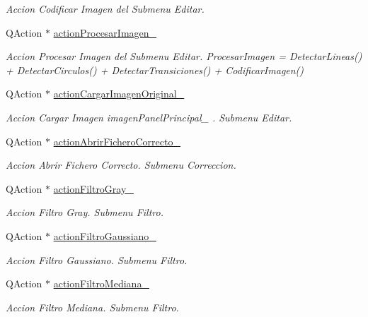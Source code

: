 \begin{DoxyCompactItemize}
\begin{DoxyCompactList}\small\item\em Accion Codificar Imagen del Submenu Editar. \end{DoxyCompactList}\item 
Q\+Action $\ast$ \hyperlink{classCAplicacion_a9fa952c19f9da356432fae60a40cdced}{action\+Procesar\+Imagen\+\_\+}
\begin{DoxyCompactList}\small\item\em Accion Procesar Imagen del Submenu Editar. Procesar\+Imagen = Detectar\+Lineas() + Detectar\+Circulos() + Detectar\+Transiciones() + Codificar\+Imagen() \end{DoxyCompactList}\item 
Q\+Action $\ast$ \hyperlink{classCAplicacion_a3768f71b55ac5e2d77fed775d8ebce74}{action\+Cargar\+Imagen\+Original\+\_\+}
\begin{DoxyCompactList}\small\item\em Accion Cargar Imagen imagen\+Panel\+Principal\+\_\+ . Submenu Editar. \end{DoxyCompactList}\item 
Q\+Action $\ast$ \hyperlink{classCAplicacion_abd9f33aa366727875ab9c798e1a4695c}{action\+Abrir\+Fichero\+Correcto\+\_\+}
\begin{DoxyCompactList}\small\item\em Accion Abrir Fichero Correcto. Submenu Correccion. \end{DoxyCompactList}\item 
Q\+Action $\ast$ \hyperlink{classCAplicacion_a62326cfe231c222d4d3411b4f9a5fc81}{action\+Filtro\+Gray\+\_\+}
\begin{DoxyCompactList}\small\item\em Accion Filtro Gray. Submenu Filtro. \end{DoxyCompactList}\item 
Q\+Action $\ast$ \hyperlink{classCAplicacion_ae6827414fe74e31b2216ec04f61ad21f}{action\+Filtro\+Gaussiano\+\_\+}
\begin{DoxyCompactList}\small\item\em Accion Filtro Gaussiano. Submenu Filtro. \end{DoxyCompactList}\item 
Q\+Action $\ast$ \hyperlink{classCAplicacion_a7121918f17fc9640c91f26961f7ee221}{action\+Filtro\+Mediana\+\_\+}
\begin{DoxyCompactList}\small\item\em Accion Filtro Mediana. Submenu Filtro. \end{DoxyCompactList}\item 

\end{DoxyCompactItemize}
